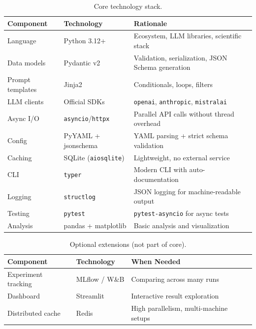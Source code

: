 \documentclass[12pt, a4paper]{article}
\begin{document}
\begin{table}[H]
\centering
\begin{tabularx}{\textwidth}{llX}
    \toprule
    \textbf{Component} & \textbf{Technology} & \textbf{Rationale} \\
    \midrule
    Language            & Python 3.12+            & Ecosystem, LLM libraries, scientific stack \\
    Data models         & Pydantic v2             & Validation, serialization, JSON Schema generation \\
    Prompt templates    & Jinja2                  & Conditionals, loops, filters \\
    LLM clients         & Official SDKs           & \texttt{openai}, \texttt{anthropic}, \texttt{mistralai} \\
    Async I/O           & \texttt{asyncio}/\texttt{httpx} & Parallel API calls without thread overhead \\
    Config              & PyYAML + jsonschema     & YAML parsing + strict schema validation \\
    Caching             & SQLite (\texttt{aiosqlite}) & Lightweight, no external service \\
    CLI                 & \texttt{typer}          & Modern CLI with auto-documentation \\
    Logging             & \texttt{structlog}      & JSON logging for machine-readable output \\
    Testing             & \texttt{pytest}         & \texttt{pytest-asyncio} for async tests \\
    Analysis            & pandas + matplotlib     & Basic analysis and visualization \\
    \bottomrule
\end{tabularx}
\caption{Core technology stack.}
\label{tab:techstack}
\end{table}

\begin{table}[H]
\centering
\begin{tabularx}{\textwidth}{llX}
    \toprule
    \textbf{Component} & \textbf{Technology} & \textbf{When Needed} \\
    \midrule
    Experiment tracking & MLflow / W\&B       & Comparing across many runs \\
    Dashboard           & Streamlit           & Interactive result exploration \\
    Distributed cache   & Redis               & High parallelism, multi-machine setups \\
    \bottomrule
\end{tabularx}
\caption{Optional extensions (not part of core).}
\label{tab:techstack-opt}
\end{table}
\end{document}
